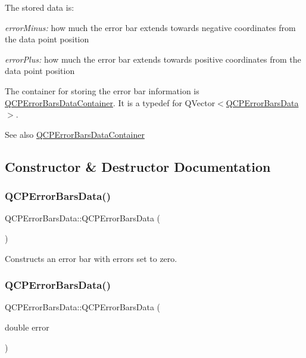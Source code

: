 The stored data is\+: \begin{DoxyItemize}
\item {\itshape error\+Minus\+:} how much the error bar extends towards negative coordinates from the data point position \item {\itshape error\+Plus\+:} how much the error bar extends towards positive coordinates from the data point position\end{DoxyItemize}
The container for storing the error bar information is \mbox{\hyperlink{qcustomplot_8h_a8c4472a4da738e0ddbf6b03222c39906}{Q\+C\+P\+Error\+Bars\+Data\+Container}}. It is a typedef for {\ttfamily Q\+Vector$<$\mbox{\hyperlink{class_q_c_p_error_bars_data}{Q\+C\+P\+Error\+Bars\+Data}}$>$}.

\begin{DoxySeeAlso}{See also}
\mbox{\hyperlink{qcustomplot_8h_a8c4472a4da738e0ddbf6b03222c39906}{Q\+C\+P\+Error\+Bars\+Data\+Container}} 
\end{DoxySeeAlso}


\subsection{Constructor \& Destructor Documentation}
\mbox{\label{class_q_c_p_error_bars_data_ac18bdb46dec56f8df7f3c99d058cc725}} 
\subsubsection{\texorpdfstring{QCPErrorBarsData()}{QCPErrorBarsData()}\hspace{0.1cm}{\footnotesize\ttfamily [1/3]}}
{\footnotesize\ttfamily Q\+C\+P\+Error\+Bars\+Data\+::\+Q\+C\+P\+Error\+Bars\+Data (\begin{DoxyParamCaption}{ }\end{DoxyParamCaption})}

Constructs an error bar with errors set to zero. \mbox{\label{class_q_c_p_error_bars_data_a73ebdaa55fa7f0052b70895b28edb444}} 
\subsubsection{\texorpdfstring{QCPErrorBarsData()}{QCPErrorBarsData()}\hspace{0.1cm}{\footnotesize\ttfamily [2/3]}}
{\footnotesize\ttfamily Q\+C\+P\+Error\+Bars\+Data\+::\+Q\+C\+P\+Error\+Bars\+Data (\begin{DoxyParamCaption}\item[{double}]{error }\end{DoxyParamCaption})\hspace{0.3cm}{\ttfamily [explicit]}}

